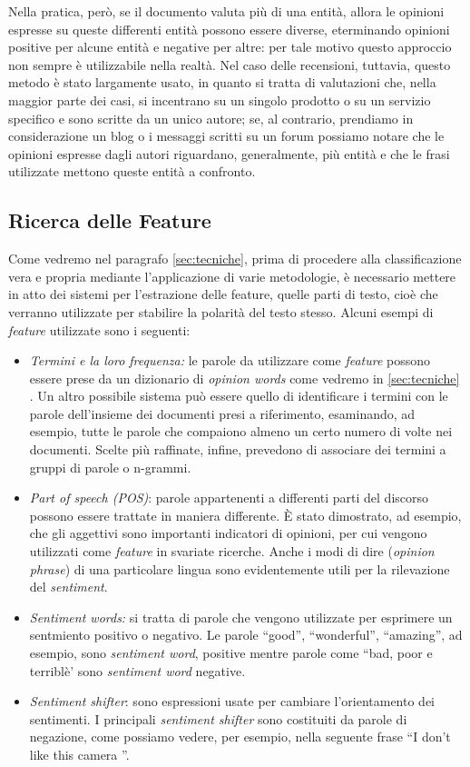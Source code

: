 \documentclass[a4paper,12pt,openright,twoside]{report}
\theoremstyle{definition}
\begin{document}
Nella pratica, però, se il documento valuta più di una entità, allora le opinioni espresse
su queste differenti entità possono essere diverse,
eterminando opinioni positive per alcune entità e negative per altre: 
per tale motivo questo approccio non sempre è utilizzabile nella realtà.
Nel caso delle recensioni, tuttavia, questo metodo è stato largamente usato, 
in quanto si tratta di valutazioni che, nella maggior parte dei casi, 
si incentrano su un singolo prodotto o su un servizio specifico e 
sono scritte da un unico autore; 
se, al contrario, prendiamo in considerazione un blog o i 
messaggi scritti su un forum possiamo notare che le opinioni 
espresse dagli autori riguardano, generalmente,  più entità  e che 
le frasi utilizzate mettono queste entità a confronto.

\subsection{Ricerca delle Feature}
Come vedremo nel paragrafo \ref{sec:tecniche}, prima di procedere alla classificazione 
vera e propria mediante l'applicazione di varie metodologie, 
è necessario mettere in atto dei sistemi per l'estrazione delle feature, 
quelle parti di testo, cioè che verranno
utilizzate per stabilire la polarità del testo stesso. Alcuni esempi di \emph{feature}
utilizzate sono i seguenti:
\begin{itemize}
	
	\item \emph{Termini e la loro frequenza:} le parole da utilizzare come \emph{feature} possono essere
	prese 	da un dizionario
		di \emph{opinion words} come vedremo in \ref{sec:tecniche} .
Un altro possibile sistema può essere quello di identificare i 
termini con le parole dell'insieme dei documenti presi 
a riferimento, esaminando, ad esempio, 
tutte le parole che compaiono almeno un certo 
numero di volte nei documenti. 
Scelte più raffinate, infine, prevedono di associare 
dei termini a gruppi di parole o n-grammi.

\item \emph{Part of speech (POS)}: parole appartenenti a differenti parti del discorso possono
essere trattate in maniera differente. \`E stato dimostrato, ad esempio, che gli aggettivi
sono importanti indicatori di opinioni, per cui vengono
utilizzati come \emph{feature} in svariate ricerche. Anche i modi di dire (\emph{opinion
phrase}) di una particolare lingua sono evidentemente utili per la rilevazione del
\emph{sentiment}.
\item \emph{Sentiment words:} si tratta di parole che vengono utilizzate per
esprimere un sentmiento positivo o negativo. Le parole ``good'', ``wonderful'',
``amazing'', ad esempio, sono \emph{sentiment word}, positive mentre parole come 
``bad, poor e terriblè'
sono \emph{sentiment word} negative.

\item \emph{Sentiment shifter}: sono espressioni usate per
cambiare l'orientamento dei sentimenti.
I principali \emph{sentiment shifter} sono costituiti da parole di negazione, 
come possiamo vedere, per esempio, nella seguente frase ``I don’t like this camera ''. 
\end{itemize}
\end{document}
